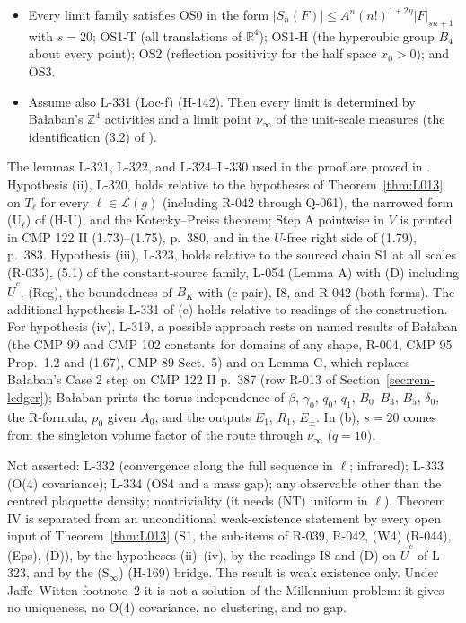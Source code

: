 \begin{theorem}
\begin{itemize}
\item[(b)] Every limit family satisfies OS0 in the form $|S_n(F)|\le A^n(n!)^{1+2\eta}|F|_{sn+1}$ with $s=20$; OS1-T (all translations of $\mathbb R^4$); OS1-H (the hypercubic group $B_4$ about every point); OS2 (reflection positivity for the half space $x_0>0$); and OS3.
\item[(c)] Assume also L-331 (Loc-f) (H-142). Then every limit is determined by Ba{\l}aban's $\mathbb Z^4$ activities and a limit point $\nu_\infty$ of the unit-scale measures (the identification (3.2) of ).
\end{itemize}
\end{theorem}
The lemmas L-321, L-322, and L-324--L-330 used in the proof are proved in . Hypothesis (ii), L-320, holds relative to the hypotheses of Theorem~\ref{thm:L013} on $T_\ell$ for every $\ell\in\mathcal L(g)$ (including R-042 through Q-061), the narrowed form (U$_\ell$) of (H-U), and the Kotecky--Preiss theorem; Step A pointwise in $V$ is printed in CMP 122 II (1.73)--(1.75), p.~380, and in the $U$-free right side of (1.79), p.~383. Hypothesis (iii), L-323, holds relative to the sourced chain S1 at all scales (R-035), (5.1) of the constant-source family, L-054 (Lemma A) with (D) including $\tilde U^c$, (Reg), the boundedness of $B_K$ with (c-pair), I8, and R-042 (both forms). The additional hypothesis L-331 of (c) holds relative to readings of the construction. For hypothesis (iv), L-319, a possible approach rests on named results of Ba{\l}aban (the CMP 99 and CMP 102 constants for domains of any shape, R-004, CMP 95 Prop.~1.2 and (1.67), CMP 89 Sect.~5) and on Lemma G, which replaces Ba{\l}aban's Case 2 step on CMP 122 II p.~387 (row R-013 of Section~\ref{sec:rem-ledger}); Ba{\l}aban prints the torus independence of $\beta$, $\gamma_0$, $q_0$, $q_1$, $B_0$--$B_3$, $B_5$, $\delta_0$, the R-formula, $p_0$ given $A_0$, and the outputs $E_1$, $R_1$, $E_\pm$. In (b), $s=20$ comes from the singleton volume factor of the route through $\nu_\infty$ ($q=10$).

Not asserted: L-332 (convergence along the full sequence in $\ell$; infrared); L-333 (O(4) covariance); L-334 (OS4 and a mass gap); any observable other than the centred plaquette density; nontriviality (it needs (NT) uniform in $\ell$). Theorem IV is separated from an unconditional weak-existence statement by every open input of Theorem~\ref{thm:L013} (S1, the sub-items of R-039, R-042, (W4) (R-044), (Eps), (D)), by the hypotheses (ii)--(iv), by the readings I8 and (D) on $\tilde U^c$ of L-323, and by the (S$_\infty$) (H-169) bridge. The result is weak existence only. Under Jaffe--Witten footnote~2 it is not a solution of the Millennium problem: it gives no uniqueness, no O(4) covariance, no clustering, and no gap.

